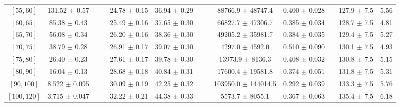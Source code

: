 \begin{tabular}{c||c|c|c|c|c|c|c|c|c|c|c||c}
$[55, 60]$ & 131.52 $\pm$ 0.57 &  &  & 24.78 $\pm$ 0.15 & 36.94 $\pm$ 0.29 &  &  & 88766.9 $\pm$ 48747.4 & 0.400 $\pm$ 0.028 &  & 127.9 $\pm$ 7.5 & 5.56\\
$[60, 65]$ & 85.38 $\pm$ 0.43 &  &  & 25.49 $\pm$ 0.16 & 37.65 $\pm$ 0.30 &  &  & 66827.7 $\pm$ 47306.7 & 0.385 $\pm$ 0.034 &  & 128.7 $\pm$ 7.5 & 4.81\\
$[65, 70]$ & 56.08 $\pm$ 0.34 &  &  & 26.20 $\pm$ 0.16 & 38.36 $\pm$ 0.30 &  &  & 49205.2 $\pm$ 35981.7 & 0.384 $\pm$ 0.035 &  & 129.4 $\pm$ 7.5 & 5.27\\
$[70, 75]$ & 38.79 $\pm$ 0.28 &  &  & 26.91 $\pm$ 0.17 & 39.07 $\pm$ 0.30 &  &  & 4297.0 $\pm$ 4592.0 & 0.510 $\pm$ 0.090 &  & 130.1 $\pm$ 7.5 & 4.93\\
$[75, 80]$ & 26.40 $\pm$ 0.23 &  &  & 27.61 $\pm$ 0.17 & 39.78 $\pm$ 0.30 &  &  & 13973.9 $\pm$ 8136.3 & 0.408 $\pm$ 0.032 &  & 130.8 $\pm$ 7.5 & 5.15\\
$[80, 90]$ & 16.04 $\pm$ 0.13 &  &  & 28.68 $\pm$ 0.18 & 40.84 $\pm$ 0.31 &  &  & 17600.4 $\pm$ 19581.8 & 0.374 $\pm$ 0.051 &  & 131.8 $\pm$ 7.5 & 5.31\\
$[90, 100]$ & 8.522 $\pm$ 0.095 &  &  & 30.09 $\pm$ 0.19 & 42.25 $\pm$ 0.32 &  &  & 103950.0 $\pm$ 144014.5 & 0.292 $\pm$ 0.039 &  & 133.3 $\pm$ 7.5 & 5.76\\
$[100, 120]$ & 3.715 $\pm$ 0.047 &  &  & 32.22 $\pm$ 0.21 & 44.38 $\pm$ 0.33 &  &  & 5573.7 $\pm$ 8055.1 & 0.367 $\pm$ 0.063 &  & 135.4 $\pm$ 7.5 & 6.18\\
\end{tabular}
